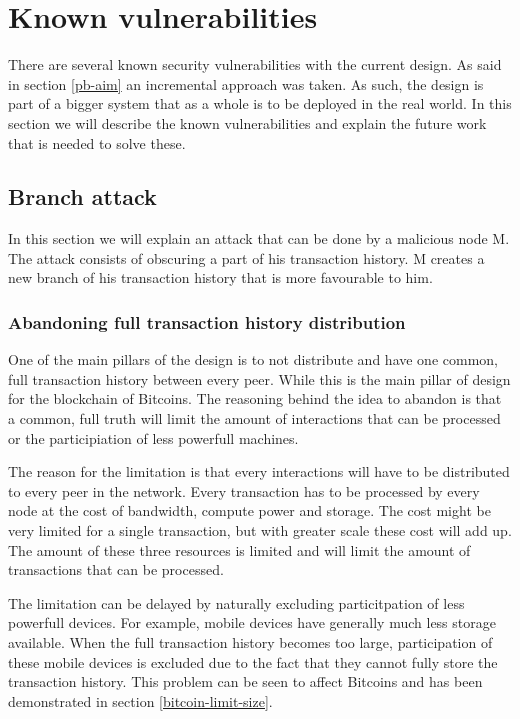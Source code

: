 \chapter{Known vulnerabilities}
\label{kv}
There are several known security vulnerabilities with the current design.
As said in section \ref{pb-aim} an incremental approach was taken.
As such, the design is part of a bigger system that as a whole is to be deployed in the real world.
In this section we will describe the known vulnerabilities
and explain the future work that is needed to solve these.

\section{Branch attack}
In this section we will explain an attack that can be done by a malicious node M.
The attack consists of obscuring a part of his transaction history.
M creates a new branch of his transaction history that is more favourable to him.

\subsection{Abandoning full transaction history distribution}
One of the main pillars of the design is to not distribute
and have one common, full transaction history between every peer.
While this is the main pillar of design for the blockchain of Bitcoins.
The reasoning behind the idea to abandon is that a common, full truth
will limit the amount of interactions that can be processed
or the participiation of less powerfull machines.

The reason for the limitation is that every interactions will have to be distributed to every peer in the network.
Every transaction has to be processed by every node at the cost of bandwidth, compute power and storage.
The cost might be very limited for a single transaction,
but with greater scale these cost will add up.
The amount of these three resources is limited and will limit the amount of transactions that can be processed.

The limitation can be delayed by naturally excluding particitpation of less powerfull devices.
For example, mobile devices have generally much less storage available.
When the full transaction history becomes too large,
participation of these mobile devices is excluded due to the fact that they cannot fully store the transaction history.
This problem can be seen to affect Bitcoins and has been demonstrated in section \ref{bitcoin-limit-size}.

